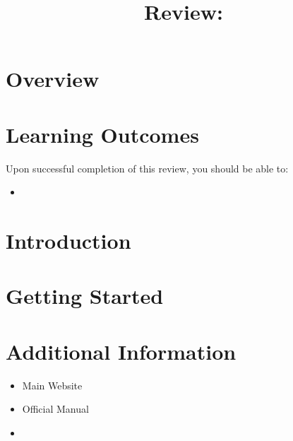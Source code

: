 \documentclass[12pt,english]{article}
\date{ }
\numberwithin{equation}{section}
\numberwithin{figure}{section}
\begin{document}
\title{Review: }
\maketitle

\section*{Overview}



\section*{Learning Outcomes \label{sec:Learning-Outcomes}}

Upon successful completion of this review, you should be able to:
\begin{itemize}
\item 
\end{itemize}

\section*{Introduction \label{sec:Introduction}}



\section*{Getting Started \label{sec:Getting-Started}}



\section*{Additional Information \label{sec:Additional-Information}}


\begin{itemize}
\item Main Website 
\item Official Manual 
\item
\end{itemize}
\end{document}
